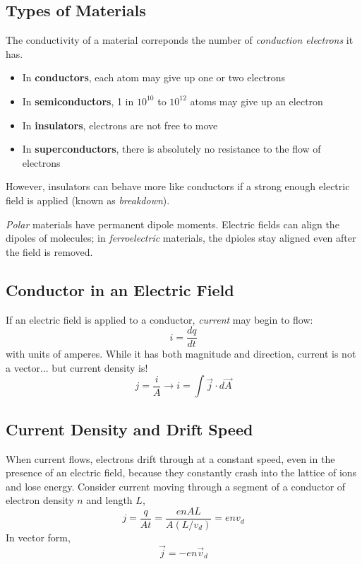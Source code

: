 \documentclass[../PhysicsFormulae.tex]{subfiles}
\begin{document}
\subsection{Types of Materials}
The conductivity of a material correponds the number of \textit{conduction electrons} it has. 
\begin{itemize}
	\itemsep0em
	\item In \textbf{conductors}, each atom may give up one or two electrons
	\item In \textbf{semiconductors}, 1 in $10^10$ to $10^12$ atoms may give up an electron
	\item In \textbf{insulators}, electrons are not free to move
	\item In \textbf{superconductors}, there is absolutely no resistance to the flow of electrons
\end{itemize}
However, insulators can behave more like conductors if a strong enough electric field is applied (known as \textit{breakdown}). \bigskip 

\textit{Polar} materials have permanent dipole moments. Electric fields can align the dipoles of molecules; in \textit{ferroelectric} materials, the dpioles stay aligned even after the field is removed. 

\subsection{Conductor in an Electric Field}
If an electric field is applied to a conductor, \textit{current} may begin to flow:
\[ i = \frac{dq}{dt} \]
with units of amperes. While it has both magnitude and direction, current is not a vector... but current density is!
\[ j = \frac{i}{A} \rightarrow i = \int \vec{j} \cdot d\vec{A} \]

\subsection{Current Density and Drift Speed}
When current flows, electrons drift through at a constant speed, even in the presence of an electric field, because they constantly crash into the lattice of ions and lose energy. Consider current moving through a segment of a conductor of electron density $n$ and length $L$, 
\[ j = \frac{q}{At} = \frac{enAL}{A(L/v_d)} = env_d \]
In vector form, 
\[ \vec{j} = -en\vec{v}_d \]
\end{document}
